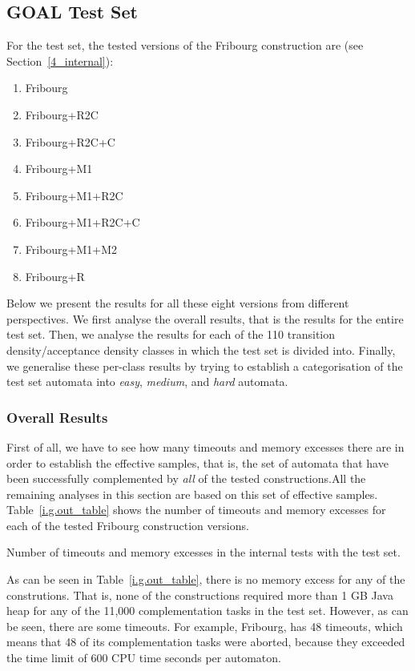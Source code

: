 \subsection{GOAL Test Set}
\label{5_internal_goal}

For the \goal{} test set, the tested versions of the Fribourg construction are (see Section~\ref{4_internal}):
\begin{enumerate}
\item Fribourg
\item Fribourg+R2C
\item Fribourg+R2C+C
\item Fribourg+M1
\item Fribourg+M1+R2C
\item Fribourg+M1+R2C+C
\item Fribourg+M1+M2
\item Fribourg+R
\end{enumerate}

Below we present the results for all these eight versions from different perspectives. We first analyse the overall results, that is the results for the entire test set. Then, we analyse the results for each of the 110 transition density/acceptance density classes in which the \goal{} test set is divided into. Finally, we generalise these per-class results by trying to establish a categorisation of the \goal{} test set automata into \textit{easy}, \textit{medium}, and \textit{hard} automata.

\subsubsection{Overall Results}
First of all, we have to see how many timeouts and memory excesses there are in order to establish the effective samples, that is, the set of automata that have been successfully complemented by \textit{all} of the tested constructions.All the remaining analyses in this section are based on this set of effective samples. Table~\ref{i.g.out_table} shows the number of timeouts and memory excesses for each of the tested Fribourg construction versions.

\begin{table}[ht]
\centering

\caption{Number of timeouts and memory excesses in the internal tests with the \goal{} test set.}
\label{i.g.out_table}
\end{table}

As can be seen in Table~\ref{i.g.out_table}, there is no memory excess for any of the construtions. That is, none of the constructions required more than 1 GB Java heap for any of the 11,000 complementation tasks in the \goal{} test set. However, as can be seen, there are some timeouts. For example, Fribourg, has 48 timeouts, which means that 48 of its complementation tasks were aborted, because they exceeded the time limit of 600 CPU time seconds per automaton.

